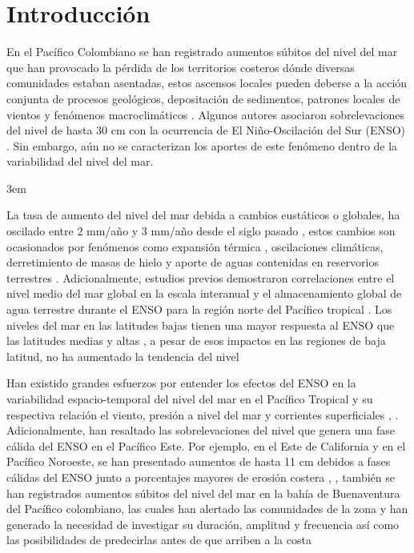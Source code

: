 \chapter{Introducción}

En el Pacífico Colombiano se han registrado aumentos súbitos del nivel del mar que han provocado la pérdida de los territorios costeros dónde diversas comunidades estaban asentadas, estos ascensos locales pueden deberse a la acción conjunta de procesos geológicos, depositación de sedimentos, patrones locales de vientos y fenómenos macroclimáticos \citep{Church2019}. Algunos autores asociaron sobrelevaciones del nivel de hasta 30 cm con la ocurrencia de El Niño-Oscilación del Sur (ENSO) \citep{Correa2000}. Sin embargo, aún no se caracterizan los aportes de este fenómeno dentro de la variabilidad del nivel del mar. 

\emergencystretch 3em

La tasa de aumento del nivel del mar debida a cambios eustáticos o globales, ha oscilado entre 2 mm/año y 3 mm/año desde el siglo pasado \citep{Cazenave2014}, estos cambios son ocasionados por fenómenos como expansión térmica \citep{Lombard2005}, oscilaciones climáticas, derretimiento de masas de hielo y aporte de aguas contenidas en reservorios terrestres \citep{Cazenave2008}. Adicionalmente, estudios previos demostraron correlaciones entre el nivel medio del mar global en la escala interanual y el almacenamiento global de agua terrestre durante el ENSO para la región norte del Pacífico tropical \citep{Cazenave2012}. Los niveles del mar en las latitudes bajas tienen una mayor respuesta al ENSO que las latitudes medias y altas \citep{Soumya2015}, a pesar de esos impactos en las regiones de baja latitud, no ha aumentado la tendencia del nivel \citep{Chang2013}

Han existido grandes esfuerzos por entender los efectos del ENSO en la variabilidad espacio-temporal del nivel del mar en el Pacífico Tropical \citep{Zhang2012} y su respectiva relación el viento, presión a nivel del mar y corrientes superficiales \citep{Delcroix1994}, \citep{Gill1983}. Adicionalmente, han resaltado las sobrelevaciones del nivel que genera una fase cálida del ENSO en el Pacífico Este. Por ejemplo, en el Este de California y en el Pacífico Noroeste, se han presentado aumentos de hasta 11 cm debidos a fases cálidas del ENSO junto a porcentajes mayores de erosión costera \citep{Cayan2008}, \citep{Barnard2015}, también se han registrados aumentos súbitos del nivel del mar en la bahía de Buenaventura del Pacífico colombiano, las cuales han alertado las comunidades de la zona y han generado la necesidad de investigar su duración, amplitud y frecuencia así como las posibilidades de predecirlas antes de que arriben a la costa \citep{Valle-Levinson2017} 

